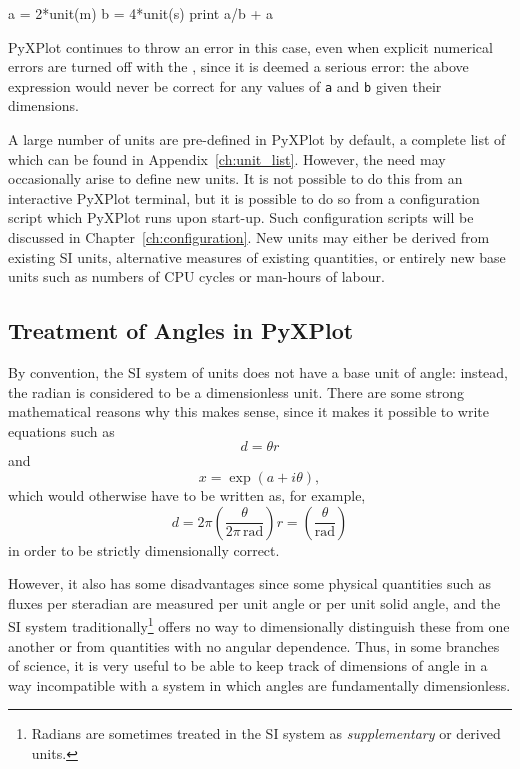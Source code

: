 \begin{dontdo}
a = 2*unit(m)\newline
b = 4*unit(s)\newline
print a/b + a
\end{dontdo}

\noindent PyXPlot continues to throw an error in this case, even when explicit
numerical errors are turned off with the ,
since it is deemed a serious error: the above expression would never be correct
for any values of {\tt a} and {\tt b} given their dimensions.

A large number of units are pre-defined in PyXPlot by default, a complete list
of which can be found in Appendix~\ref{ch:unit_list}.  However, the need may
occasionally arise to define new units. It is not possible to do this from an
interactive PyXPlot terminal, but it is possible to do so from a configuration
script which PyXPlot runs upon start-up. Such configuration scripts will be
discussed in Chapter~\ref{ch:configuration}. New units may either be derived
from existing SI units, alternative measures of existing quantities, or
entirely new base units such as numbers of CPU cycles or man-hours of labour.

\subsection{Treatment of Angles in PyXPlot}
\label{sec:angles}

By convention, the SI system of units does not have a base unit of angle:
instead, the radian is considered to be a dimensionless unit.  There are some
strong mathematical reasons why this makes sense, since it makes it possible to
write equations such as
\begin{displaymath}
d=\theta r
\end{displaymath}
and
\begin{displaymath}
x = \exp(a+i\theta),
\end{displaymath}
which would otherwise have to be written as, for example,
\begin{displaymath}
d=2\pi\left(\frac{\theta}{2\pi\,\mathrm{rad}}\right) r=\left(\frac{\theta}{\mathrm{rad}}\right)
\end{displaymath}
in order to be strictly dimensionally correct.

However, it also has some disadvantages since some physical quantities such as
fluxes per steradian are measured per unit angle or per unit solid angle, and
the SI system traditionally\footnote{Radians are sometimes treated in the SI
system as {\it supplementary} or derived units.} offers no way to dimensionally
distinguish these from one another or from quantities with no angular
dependence. Thus, in some branches of science, it is very useful to be able to
keep track of dimensions of angle in a way incompatible with a system in which
angles are fundamentally dimensionless.

